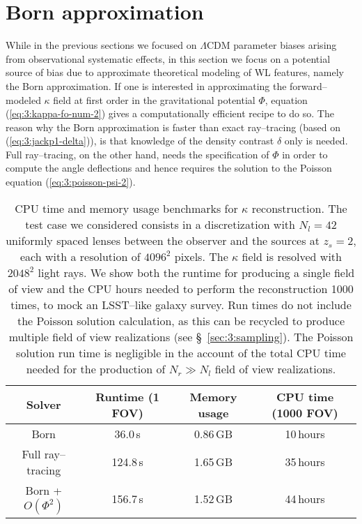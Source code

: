 \section{Born approximation}
\label{sec:7:born}
While in the previous sections we focused on $\Lambda$CDM parameter biases arising from observational systematic effects, in this section we focus on a  potential source of bias due to approximate theoretical modeling of WL features, namely the Born approximation. If one is interested in approximating the forward--modeled $\kappa$ field at first order in the gravitational potential $\Phi$, equation (\ref{eq:3:kappa-fo-num-2}) gives a computationally efficient recipe to do so. The reason why the Born approximation is faster than exact ray--tracing (based on (\ref{eq:3:jackp1-delta})), is that knowledge of the density contrast $\delta$ only is needed. Full ray--tracing, on the other hand, needs the specification of $\Phi$ in order to compute the angle deflections and hence requires the solution to the Poisson equation (\ref{eq:3:poisson-psi-2}). 
%
\begin{table}
\begin{center}
\begin{tabular}{c|c|c|c}
\textbf{Solver} & \textbf{Runtime (1 FOV)} & \textbf{Memory usage} & \textbf{CPU time (1000 FOV)} \\ \hline \hline
Born & 36.0\,s & 0.86\,GB & 10\,hours  \\
Full ray--tracing & 124.8\,s & 1.65\,GB & 35\,hours  \\
Born + $O(\Phi^2)$ & 156.7\,s & 1.52\,GB & 44\,hours \\ \hline
\end{tabular}
\end{center}
\caption{CPU time and memory usage benchmarks for $\kappa$ reconstruction. The test case we considered consists in a discretization with $N_l=42$ uniformly spaced lenses between the observer and the sources at $z_s=2$, each with a resolution of $4096^2$ pixels. The $\kappa$ field is resolved with $2048^2$ light rays. We show both the runtime for producing a single field of view and the CPU hours needed to perform the reconstruction 1000 times, to mock an LSST--like galaxy survey. Run times do not include the Poisson solution calculation, as this can be recycled to produce multiple field of view realizations (see \S~\ref{sec:3:sampling}). The Poisson solution run time is negligible in the account of the total CPU time needed for the production of $N_r\gg N_l$ field of view realizations.}
\label{tab:7:benchmarks}
\end{table}
